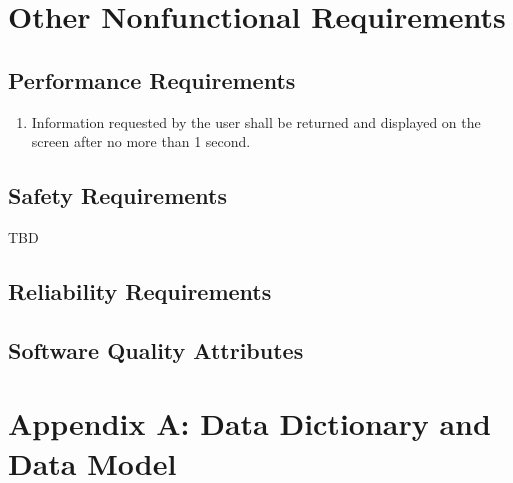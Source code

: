 \documentclass[pdftex,12pt,letter]{article}
\begin{document}
\section{Other Nonfunctional Requirements}
\subsection{Performance Requirements}
\begin{enumerate}[PR-1:]
\item Information requested by the user shall be returned and displayed on the screen after no more than 1 second.
\end{enumerate}
\subsection{Safety Requirements}
TBD
\subsection{Reliability Requirements}
\subsection{Software Quality Attributes}
\section*{Appendix A: Data Dictionary and Data Model}
\end{document}
